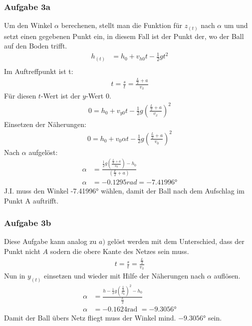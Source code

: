 \documentclass[a4paper,11pt]{article}
\begin{document}
    \subsubsection*{Aufgabe 3a}
        Um den Winkel $\alpha$ berechenen, stellt man die Funktion für $z_{(t)}$ nach $\alpha$ um und setzt einen gegebenen Punkt ein, in diesem Fall ist der Punkt der, wo der Ball auf den Boden trifft.
        \begin{align*}
          h_{(t)}&=h_0+v_{h0}t-\frac{1}{2}gt^2 \\
        \end{align*}
        Im Auftreffpunkt ist t:
        \begin{align*}
          t=\frac{s}{t}=\frac{\frac{L}{2}+a}{v_x}
        \end{align*}
        Für diesen $t$-Wert ist der $y$-Wert 0.
        \begin{align*}
          0=h_0+v_{y0}t-\frac{1}{2}g\left(\frac{\frac{L}{2}+a}{v_x}\right)^2
        \end{align*}
        Einsetzen der Näherungen:
        \begin{align*}
          0=h_0+v_0\alpha t-\frac{1}{2}g\left(\frac{\frac{L}{2}+a}{v_0}\right)^2
        \end{align*}
        Nach $\alpha$ aufgelöst:
         \begin{align*}
          \alpha &= \frac{\frac{1}{2}g\left(\frac{\frac{L}{2}+a}{v_0}\right)-h_0}{\left(\frac{L}{2}+a\right)} \\
          \alpha &= -0.1295 rad = \ang{-7.41996}
        \end{align*}
        J.I. muss den Winkel \ang{-7.41996} wählen, damit der Ball nach dem Aufschlag im Punkt A auftrifft.
      \subsubsection*{Aufgabe 3b}
        Diese Aufgabe kann analog zu $a)$ gelöst werden mit dem Unterschied, dass der Punkt nicht $A$ sodern die obere Kante des Netzes sein muss.
        \begin{align*}
          t=\frac{s}{t}=\frac{\frac{L}{2}}{v_x}
        \end{align*}
        Nun in $y_{(t)}$ einsetzen und wieder mit Hilfe der Näherungen nach $\alpha$ auflösen.
        \begin{align*}
          \alpha &= \frac{h-\frac{1}{2}g\left(\frac{\frac{L}{2}}{v_0}\right)^2-h_0}{\frac{L}{2}} \\
          \alpha &= -0.1624 \mbox{rad } = \ang{-9.3056}
        \end{align*}
        Damit der Ball übers Netz fliegt muss der Winkel mind. $\ang{-9.3056}$ sein.
\end{document}
